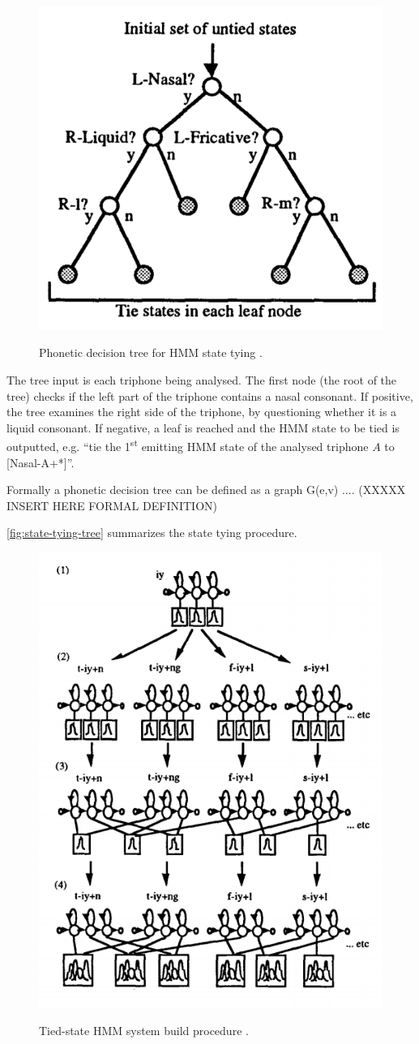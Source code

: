 \begin{figure}[!htb]
        \myfloatalign
        {\includegraphics[width=.66\linewidth]{gfx/decision-tree.png}}
        \caption{Phonetic decision tree for HMM state tying \citep{Young1994}.}
        \label{fig:decision-tree}
\end{figure}

The tree input is each triphone being analysed. The first node (the root of the tree) checks if the left 
part of the triphone contains a nasal consonant. If positive, the tree examines the right side of the triphone, by questioning
whether it is a liquid consonant. If negative, a leaf is reached and the HMM state to be tied is outputted, e.g. ``tie
the 1\textsuperscript{st} emitting HMM state of the analysed triphone $A$ to [Nasal-A+*]''.

Formally a phonetic decision tree can be defined as a graph G(e,v) .... (XXXXX INSERT HERE FORMAL DEFINITION)

\autoref{fig:state-tying-tree} summarizes the state tying procedure.

\begin{figure}[!htb]
        \myfloatalign
        {\includegraphics[width=.66\linewidth]{gfx/state-tying-tree.png}}
        \caption{Tied-state HMM system build procedure \citep{Young1994}.}
        \label{fig:state-tying-tree}
\end{figure}

